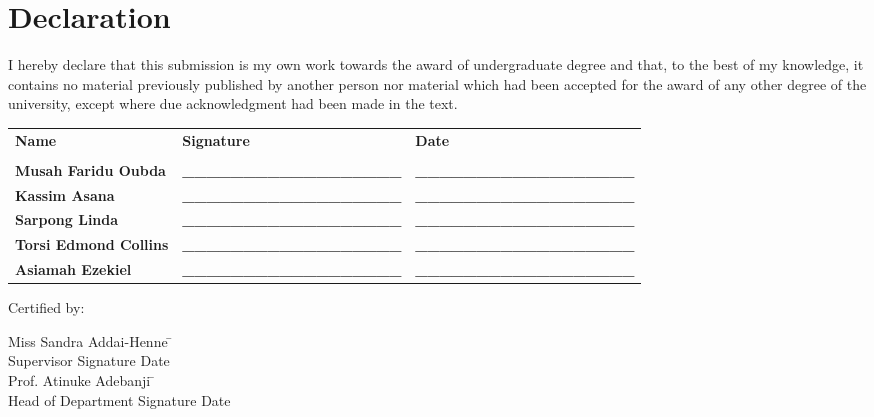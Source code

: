 \documentclass[12pt]{report}
\begin{document}
	\chapter*{Declaration}
	
	I hereby declare that this submission is my own work towards the award of undergraduate degree and that, to the best of my knowledge, it contains no material previously published by another person nor material which had been accepted for the award of any other degree of the university, except where due acknowledgment had been made in the text.
	
	\vspace{1cm}
	
	
	\begin{tabular}{>{\bfseries}l >{\bfseries}l >{\bfseries}l}
		Name & Signature & Date \\
		\\
		Musah Faridu Oubda & \_\_\_\_\_\_\_\_\_\_\_\_\_\_\_\_\_\_ & \_\_\_\_\_\_\_\_\_\_\_\_\_\_\_\_\_\_ \\
		Kassim Asana & \_\_\_\_\_\_\_\_\_\_\_\_\_\_\_\_\_\_ & \_\_\_\_\_\_\_\_\_\_\_\_\_\_\_\_\_\_ \\
		Sarpong Linda & \_\_\_\_\_\_\_\_\_\_\_\_\_\_\_\_\_\_ & \_\_\_\_\_\_\_\_\_\_\_\_\_\_\_\_\_\_ \\
		Torsi Edmond Collins & \_\_\_\_\_\_\_\_\_\_\_\_\_\_\_\_\_\_ & \_\_\_\_\_\_\_\_\_\_\_\_\_\_\_\_\_\_ \\
		Asiamah Ezekiel & \_\_\_\_\_\_\_\_\_\_\_\_\_\_\_\_\_\_ & \_\_\_\_\_\_\_\_\_\_\_\_\_\_\_\_\_\_ \\
	\end{tabular}
	
	\vspace{1cm}
	
	Certified by:
	
	\vspace{1cm}
	
	\begin{tabbing}
		Miss Sandra Addai-Henne \hspace{5cm} \= \dotfill \\
		\> Supervisor Signature \hspace{1cm} Date \\
		Prof. Atinuke Adebanji \hspace{5cm} \= \dotfill \\
		\> Head of Department Signature \hspace{1cm} Date \\
	\end{tabbing}
	
\end{document}
